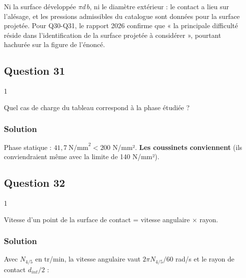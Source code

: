 \documentclass[11pt,a4paper]{article}
\begin{document}
\begin{piege}

Ni la surface développée \(\pi d\,b\), ni le diamètre extérieur : le contact a lieu sur l'alésage, et les pressions admissibles du catalogue sont données pour la surface projetée. Pour Q30-Q31, le rapport 2026 confirme que « la principale difficulté réside dans l'identification de la surface projetée à considérer », pourtant hachurée sur la figure de l'énoncé.

\end{piege}

\hypertarget{question-31}{%
\subsection{Question 31}\label{question-31}}

\begin{indication}{1}

Quel cas de charge du tableau correspond à la phase étudiée ?

\end{indication}

\hypertarget{solution-30}{%
\subsubsection{Solution}\label{solution-30}}

Phase statique : \(41{,}7\ \text{N/mm}^2<200\) N/mm². \textbf{Les coussinets conviennent} (ils conviendraient même avec la limite de 140 N/mm²).

\hypertarget{question-32}{%
\subsection{Question 32}\label{question-32}}

\begin{indication}{1}

Vitesse d'un point de la surface de contact = vitesse angulaire × rayon.

\end{indication}

\hypertarget{solution-31}{%
\subsubsection{Solution}\label{solution-31}}

Avec \(N_{4/5}\) en tr/min, la vitesse angulaire vaut \(2\pi N_{4/5}/60\) rad/s et le rayon de contact \(d_{int}/2\) :
\end{document}
